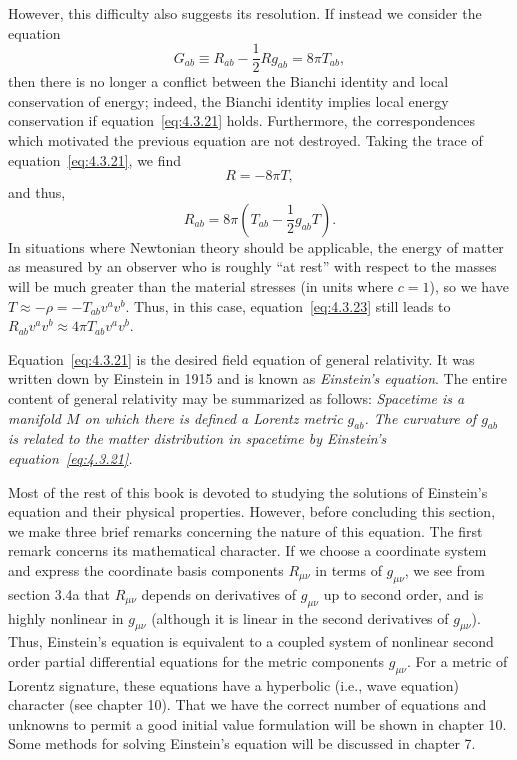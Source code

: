 However, this difficulty also suggests its resolution. If instead we consider the
equation
\begin{equation}
  G_{ab}\equiv R_{ab}-\frac12Rg_{ab}=8\pi T_{ab} ,
  \tag{4.3.21}\label{eq:4.3.21}
\end{equation}
then there is no longer a conflict between the Bianchi identity and local
conservation of energy; indeed, the Bianchi identity implies local energy
conservation if equation~\eqref{eq:4.3.21} holds. Furthermore, the
correspondences which motivated the previous equation are not destroyed. Taking
the trace of equation~\eqref{eq:4.3.21}, we find
\begin{equation}
  R=-8\pi T ,
  \tag{4.3.22}\label{eq:4.3.22}
\end{equation}
and thus,
\begin{equation}
  R_{ab}=8\pi\left(T_{ab}-\frac12g_{ab}T\right) .
  \tag{4.3.23}\label{eq:4.3.23}
\end{equation}
In situations where Newtonian theory should be applicable, the energy of matter
as measured by an observer who is roughly \textquotedblleft at
rest\textquotedblright{} with respect to the masses will be much greater than the
material stresses (in units where \(c=1\)), so we have
\(T\approx-\rho=-T_{ab}v^av^b\). Thus, in this case,
equation~\eqref{eq:4.3.23} still leads to
\(R_{ab}v^av^b\approx4\pi T_{ab}v^av^b\).

Equation~\eqref{eq:4.3.21} is the desired field equation of general relativity. It
was written down by Einstein in 1915 and is known as \emph{Einstein's equation}.
The entire content of general relativity may be summarized as follows:
\emph{Spacetime is a manifold \(M\) on which there is defined a Lorentz metric
\(g_{ab}\). The curvature of \(g_{ab}\) is related to the matter distribution
in spacetime by Einstein's equation~\eqref{eq:4.3.21}.}

Most of the rest of this book is devoted to studying the solutions of Einstein's
equation and their physical properties. However, before concluding this section,
we make three brief remarks concerning the nature of this equation. The first
remark concerns its mathematical character. If we choose a coordinate system and
express the coordinate basis components \(R_{\mu\nu}\) in terms of
\(g_{\mu\nu}\), we see from section 3.4a that \(R_{\mu\nu}\) depends on
derivatives of \(g_{\mu\nu}\) up to second order, and is highly nonlinear in
\(g_{\mu\nu}\) (although it is linear in the second derivatives of
\(g_{\mu\nu}\)). Thus, Einstein's equation is equivalent to a coupled system of
nonlinear second order partial differential equations for the metric components
\(g_{\mu\nu}\). For a metric of Lorentz signature, these equations have a
hyperbolic (i.e., wave equation) character (see chapter 10). That we have the
correct number of equations and unknowns to permit a good initial value formulation
will be shown in chapter 10. Some methods for solving Einstein's equation will be
discussed in chapter 7.

